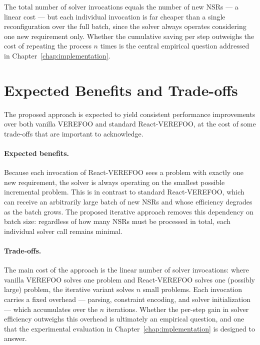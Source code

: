 The total number of solver invocations equals the number of new NSRs — a linear cost — but each individual invocation is far cheaper than a single reconfiguration over the full batch, since the solver always operates considering one new requirement only. Whether the cumulative saving per step outweighs the cost of repeating the process $n$ times is the central empirical question addressed in Chapter~\ref{chap:implementation}.


\section{Expected Benefits and Trade-offs}

The proposed approach is expected to yield consistent performance improvements over both vanilla VEREFOO and standard React-VEREFOO, at the cost of some trade-offs that are important to acknowledge.

\paragraph{Expected benefits.} Because each invocation of React-VEREFOO sees a problem with exactly one new requirement, the solver is always operating on the smallest possible incremental problem. This is in contrast to standard React-VEREFOO, which can receive an arbitrarily large batch of new NSRs and whose efficiency degrades as the batch grows. The proposed iterative approach removes this dependency on batch size: regardless of how many NSRs must be processed in total, each individual solver call remains minimal.

\paragraph{Trade-offs.} The main cost of the approach is the linear number of solver invocations: where vanilla VEREFOO solves one problem and React-VEREFOO solves one (possibly large) problem, the iterative variant solves $n$ small problems. Each invocation carries a fixed overhead — parsing, constraint encoding, and solver initialization — which accumulates over the $n$ iterations. Whether the per-step gain in solver efficiency outweighs this overhead is ultimately an empirical question, and one that the experimental evaluation in Chapter~\ref{chap:implementation} is designed to answer.

